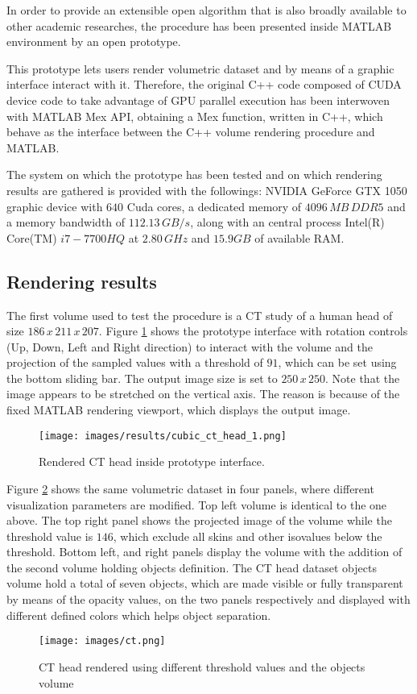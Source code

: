 \documentclass[12pt,a4paper]{extarticle}
\newcommand{\linespace}{\vspace{8pt}}
\begin{document}
In order to provide an extensible open algorithm that is also broadly available to other academic researches, the procedure has been presented inside MATLAB environment by an open prototype.

This prototype lets users render volumetric dataset and by means of a graphic interface interact with it. Therefore, the original C++ code composed of CUDA device code to take advantage of GPU parallel execution has been interwoven with MATLAB Mex API, obtaining a Mex function, written in C++, which behave as the interface between the C++ volume rendering procedure and MATLAB.
\linespace

The system on which the prototype has been tested and on which rendering results are gathered is provided with the followings: NVIDIA GeForce GTX 1050 graphic device with $640$ Cuda cores, a dedicated memory of $4096\,MB\,DDR5$ and a memory bandwidth of $112.13\,GB/s$, along with an central process Intel(R) Core(TM) $i7-7700HQ$ at $2.80\,GHz$ and $15.9GB$ of available RAM. 
\subsection{Rendering results} 
The first volume used to test the procedure is a CT study of  a human head of size $186\,x\,211\,x\,207$. Figure \ref{fig:cubic_ct_head} shows the prototype interface with rotation controls (Up, Down, Left and Right direction) to interact with the volume and the projection of the sampled values with a threshold of $91$, which can be set using the bottom sliding bar. The output image size is set to $ 250\,x\,250$. Note that the image appears to be stretched on the vertical axis. The reason is because of the fixed MATLAB rendering viewport, which displays the output image.

\begin{figure}[hbtp]
\centering
\texttt{[image: images/results/cubic\_ct\_head\_1.png]}
\caption{Rendered CT head inside prototype interface.}
\label{fig:cubic_ct_head}
\end{figure}

\linespace

Figure \ref{fig:ct} shows the same volumetric dataset in four panels, where different visualization parameters are modified. Top left volume is identical to the one above. The top right panel shows the projected image of the volume while the threshold value is $146$, which exclude all skins and other isovalues below the threshold. Bottom left, and right panels display the volume with the addition of the second volume holding objects definition. The CT head dataset objects volume hold a total of seven objects, which are made visible or fully transparent by means of the opacity values, on the two panels respectively and displayed with different defined colors which helps object separation.
\begin{figure}[hbtp]
\centering
\texttt{[image: images/ct.png]}
\caption{CT head rendered using different threshold values and the objects volume}
\label{fig:ct}
\end{figure}
\end{document}

